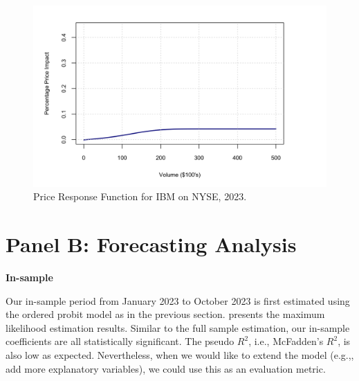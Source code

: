 \begin{figure}[H]
    \centering
    \includegraphics[width=1.1\textwidth]{figures/main_results/price_response.png}
    \caption{Price Response Function for IBM on NYSE, 2023.}
    \label{fig:figure-2}
\end{figure}


\clearpage



\section{Panel B: Forecasting Analysis}

{\noindent\bfseries In-sample }

Our in-sample period from January 2023 to October 2023 is first estimated using the ordered probit model as in the previous section.  presents the maximum likelihood estimation results. Similar to the full sample estimation, our in-sample coefficients are all statistically significant. The pseudo $R^2$, i.e., McFadden's $R^2$, is also low as expected. Nevertheless, when we would like to extend the model (e.g.,, add more explanatory variables), we could use this as an evaluation metric.






